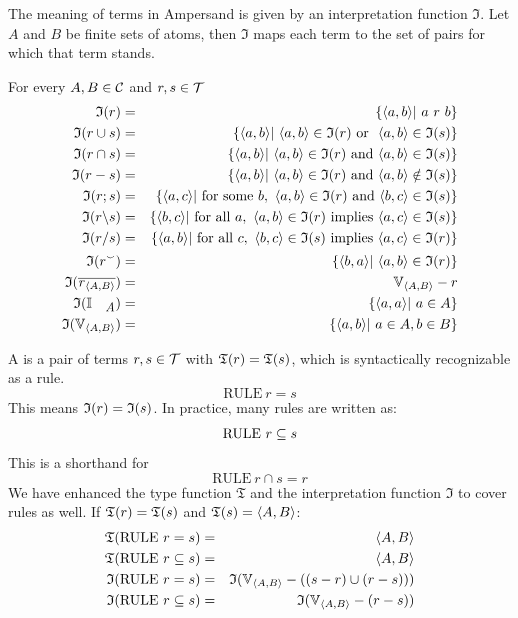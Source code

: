 \documentclass{svproc}
\begin{document}
 	The meaning of terms in Ampersand is given by an interpretation function $\mathfrak{I}$.
	Let $A$ and $B$ be finite sets of atoms, then $\mathfrak{I}$ maps each term to the set of pairs for which that term stands.
\begin{definition}
\label{interpretation of terms}
\item   For every $A,B\in\mathcal{C}$ and $r,s\in\mathcal{T}$
\begin{eqnarray}
	\ti{r}		 &=&\{\pair{a}{b}|\ a\ r\ b\}	\\
	\ti{r \cup s}	 &=&\{\pair{a}{b}|\ \pair{a}{b}\in\ti{r}\ \text{or }\ \pair{a}{b}\in\ti{s}\}	\\
	\ti{r \cap s}	 &=&\{\pair{a}{b}|\ \pair{a}{b}\in\ti{r}\ \text{and}\ \pair{a}{b}\in\ti{s}\}	\\
	\ti{r-s}	 &=&\{\pair{a}{b}|\ \pair{a}{b}\in\ti{r}\ \text{and}\ \pair{a}{b}\notin\ti{s}\}	\\
	\ti{r;s}	 &=&\{\pair{a}{c}|\ \text{for some}\ b,\ \pair{a}{b}\in\ti{r}\ \text{and}\ \pair{b}{c}\in\ti{s}\}	\\
	\ti{r\backslash s}	 &=&\{\pair{b}{c}|\ \text{for all}\ a,\ \pair{a}{b}\in\ti{r}\ \text{implies}\ \pair{a}{c}\in\ti{s}\}	\\
	\ti{r\slash s}	 &=&\{\pair{a}{b}|\ \text{for all}\ c,\ \pair{b}{c}\in\ti{s}\ \text{implies}\ \pair{a}{c}\in\ti{r}\}	\\
	\ti{\flip{r}}	 &=&\{\pair{b}{a}|\ \pair{a}{b}\in\ti{r}    \}	\\
	\ti{\cmpl{\declare{r}{A}{B}}}	 &=&\fullt{A}{B}-r	\\
	\ti{\ident{A}} 	 &=&\{\pair{a}{a}|\ a\in A\}	\\
	\ti{\fullt{A}{B}}&=&\{\pair{a}{b}|\ a\in A, b\in B\}
\end{eqnarray}
\end{definition}

	A  is a pair of terms $r,s\in\mathcal{T}$ with $\mathfrak{T}(r)=\mathfrak{T}(s)$, which is syntactically recognizable as a rule.
\[\text{RULE}\ r = s\]
	This means \(\mathfrak{I}(r) = \mathfrak{I}(s)\). In practice, many rules are written as:
\[\text{RULE}\ r\subseteq s\]
	This is a shorthand for 
\[\text{RULE}\ r\cap s = r\]
	We have enhanced the type function $\mathfrak{T}$ and the interpretation function $\mathfrak{I}$ to cover rules as well.
	If $\mathfrak{T}(r)=\mathfrak{T}(s)$ and $\mathfrak{T}(s)=\langle{A},{B}\rangle$:
\begin{eqnarray}
	\tf{\text{RULE}\ r = s}   &=&\pair{A}{B}\\
	\tf{\text{RULE}\ r\subs s}&=&\pair{A}{B}\\
	\ti{\text{RULE}\ r = s}   &=&\ti{\fullt{A}{B}-((s-r)\cup(r-s))}\\
	\ti{\text{RULE}\ r\subs s}&=&\ti{\fullt{A}{B}-(r-s)}
\end{eqnarray}
\end{document}
